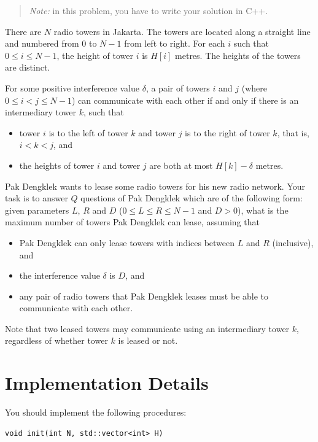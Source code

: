 
\begin{quote}
\textit{Note:} in this problem, you have to write your solution in C++.
\end{quote}

There are $N$ radio towers in Jakarta. The towers are located along a straight line and numbered
from $0$ to $N-1$ from left to right. For each $i$ such that $0 \leq i \leq N-1$, the height of tower
$i$ is $H[i]$ metres. The heights of the towers are distinct.

For some positive interference value $\delta$, a pair of towers $i$ and $j$ (where
$0 \leq i < j \leq N-1$) can communicate with each other if and only if there is an intermediary
tower $k$, such that
\begin{itemize}
  \item tower $i$ is to the left of tower $k$ and tower $j$ is to the right of tower $k$, that is,
  $i < k < j$, and
  \item the heights of tower $i$ and tower $j$ are both at most $H[k] - \delta$ metres.
\end{itemize}

Pak Dengklek wants to lease some radio towers for his new radio network. Your task is to answer $Q$
questions of Pak Dengklek which are of the following form: given parameters $L$, $R$ and $D$
($0 \leq L \leq R \leq N-1$ and $D > 0$), what is the maximum number of towers Pak Dengklek can
lease, assuming that
\begin{itemize}
  \item Pak Dengklek can only lease towers with indices between $L$ and $R$ (inclusive), and
  \item the interference value $\delta$ is $D$, and
  \item any pair of radio towers that Pak Dengklek leases must be able to communicate with each
  other.
\end{itemize}

Note that two leased towers may communicate using an intermediary tower $k$, regardless of whether
tower $k$ is leased or not.

\section*{Implementation Details}
You should implement the following procedures:

\begin{verbatim}
void init(int N, std::vector<int> H)
\end{verbatim}

